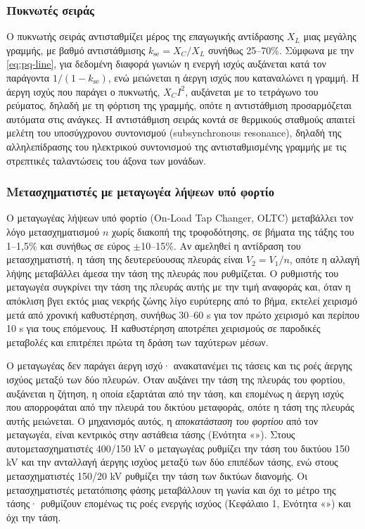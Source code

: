 \subsubsection{Πυκνωτές σειράς}

Ο πυκνωτής σειράς αντισταθμίζει μέρος της επαγωγικής αντίδρασης $X_L$ μιας μεγάλης γραμμής,
με βαθμό αντιστάθμισης $k_{\mathrm{se}} = X_C / X_L$ συνήθως 25--70\%. Σύμφωνα με την
\eqref{eq:pq-line}, για δεδομένη διαφορά γωνιών η ενεργή ισχύς αυξάνεται κατά τον παράγοντα
$1/(1 - k_{\mathrm{se}})$, ενώ μειώνεται η άεργη ισχύς που καταναλώνει η γραμμή. Η άεργη
ισχύς που παράγει ο πυκνωτής, $X_C I^2$, αυξάνεται με το τετράγωνο του ρεύματος, δηλαδή με τη
φόρτιση της γραμμής, οπότε η αντιστάθμιση προσαρμόζεται αυτόματα στις ανάγκες. Η αντιστάθμιση
σειράς κοντά σε θερμικούς σταθμούς απαιτεί μελέτη του υποσύγχρονου συντονισμού
(subsynchronous resonance), δηλαδή της αλληλεπίδρασης του ηλεκτρικού συντονισμού της
αντισταθμισμένης γραμμής με τις στρεπτικές ταλαντώσεις του άξονα των μονάδων.

\subsubsection{Μετασχηματιστές με μεταγωγέα λήψεων υπό φορτίο}
\label{sec:oltc}

Ο μεταγωγέας λήψεων υπό φορτίο (On-Load Tap Changer, OLTC) μεταβάλλει τον λόγο
μετασχηματισμού $n$ χωρίς διακοπή της τροφοδότησης, σε βήματα της τάξης του 1--1,5\% και
συνήθως σε εύρος $\pm$10--15\%. Αν αμεληθεί η αντίδραση του μετασχηματιστή, η τάση της
δευτερεύουσας πλευράς είναι $V_2 = V_1/n$, οπότε η αλλαγή λήψης μεταβάλλει άμεσα την τάση
της πλευράς που ρυθμίζεται. Ο ρυθμιστής του μεταγωγέα συγκρίνει την τάση της πλευράς αυτής με
την τιμή αναφοράς και, όταν η απόκλιση βγει εκτός μιας νεκρής ζώνης λίγο ευρύτερης από το
βήμα, εκτελεί χειρισμό μετά από χρονική καθυστέρηση, συνήθως 30--60 s για τον πρώτο χειρισμό
και περίπου 10 s για τους επόμενους. Η καθυστέρηση αποτρέπει χειρισμούς σε παροδικές
μεταβολές και επιτρέπει πρώτα τη δράση των ταχύτερων μέσων.

Ο μεταγωγέας δεν παράγει άεργη ισχύ· ανακατανέμει τις τάσεις και τις ροές άεργης ισχύος
μεταξύ των δύο πλευρών. Όταν αυξάνει την τάση της πλευράς του φορτίου, αυξάνεται η ζήτηση, η
οποία εξαρτάται από την τάση, και επομένως η άεργη ισχύς που απορροφάται από την πλευρά του
δικτύου μεταφοράς, οπότε η τάση της πλευράς αυτής μειώνεται. Ο μηχανισμός αυτός, η
\emph{αποκατάσταση του φορτίου} από τον μεταγωγέα, είναι κεντρικός στην αστάθεια τάσης
(Ενότητα «»). Στους αυτομετασχηματιστές 400/150 kV ο μεταγωγέας
ρυθμίζει την τάση του δικτύου 150 kV και την ανταλλαγή άεργης ισχύος μεταξύ των δύο επιπέδων
τάσης, ενώ στους μετασχηματιστές 150/20 kV ρυθμίζει την τάση των δικτύων διανομής. Οι
μετασχηματιστές μετατόπισης φάσης μεταβάλλουν τη γωνία και όχι το μέτρο της τάσης· ρυθμίζουν
επομένως τις ροές ενεργής ισχύος (Κεφάλαιο 1, Ενότητα «») και όχι την τάση.

